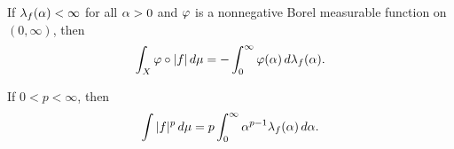 \vs

\begin{prop}
If $\lambda_f(\alpha) < \infty$ for all $\alpha > 0$ and $\varphi$ is a nonnegative Borel measurable function on $(0,\infty)$, then
\[\int_X\varphi\circ|f|\,d\mu = -\int_0^\infty \varphi(\alpha)\,d\lambda_f(\alpha).\]
\end{prop}

\vs
\begin{prop}
If $0 < p < \infty$, then
\[\int|f|^p\,d\mu = p \int_0^\infty \alpha^{p - 1}\lambda_f(\alpha)\,d\alpha.\]
\end{prop}